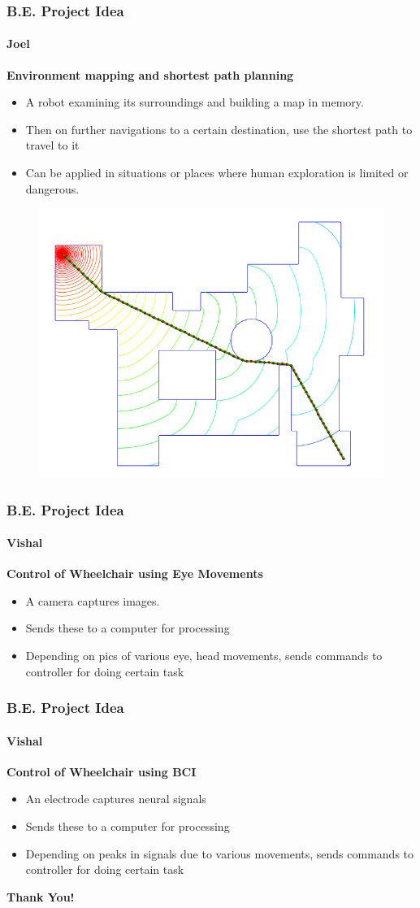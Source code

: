 \documentclass[table,10pt,red]{beamer}	%
\begin{document}
\begin{frame}
	\frametitle{B.E. Project Idea}
	\framesubtitle{Joel}
	\textbf{Environment mapping and shortest path planning}
	\begin{itemize}
		\item A robot examining its surroundings and building a map in memory.
		\item Then on further navigations to a certain destination, use the shortest path to travel to it
		\item Can be applied in situations or places where human exploration is limited or dangerous.
	\end{itemize}
	\begin{figure}
		\includegraphics[width=0.5\linewidth]{shortest}
	\end{figure}
\end{frame}

\begin{frame}
	\frametitle{B.E. Project Idea}
	\framesubtitle{Vishal}
	\textbf{Control of Wheelchair using Eye Movements}
	\begin{itemize}
		\item A camera captures images.
		\item Sends these to a computer for processing
		\item Depending on pics of various eye, head movements, sends commands to controller for doing certain task
	\end{itemize}
\end{frame}

\begin{frame}
	\frametitle{B.E. Project Idea}
	\framesubtitle{Vishal}
	\textbf{Control of Wheelchair using BCI}
	\begin{itemize}
		\item An electrode captures neural signals
		\item Sends these to a computer for processing
		\item Depending on peaks in signals due to various movements, sends commands to controller for doing certain task
	\end{itemize}
\end{frame}

\begin{frame}
\begin{center}
\textbf{\LARGE Thank You!}
\end{center}

\end{frame}
\end{document}
